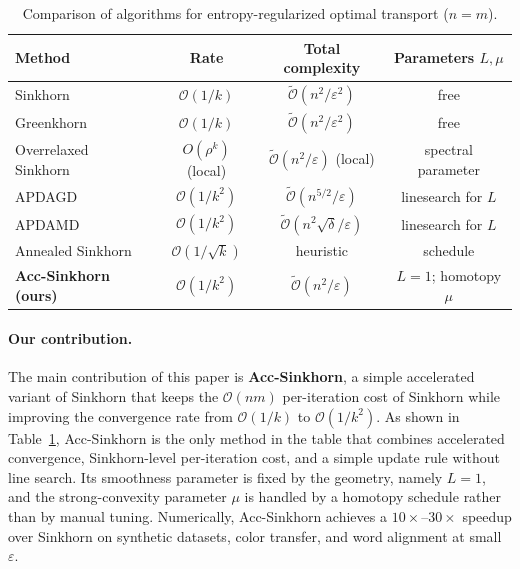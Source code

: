 \documentclass{article}
\theoremstyle{plain}
\theoremstyle{remark}
\begin{document}
\begin{table}[htp]
\centering
\caption{Comparison of algorithms for entropy-regularized optimal transport ($n=m$).}
\label{tab:comparison}
\renewcommand{\arraystretch}{1.3}
\begin{tabular}{lccc}
\toprule
\textbf{Method}
  & \textbf{Rate}
  & \textbf{Total complexity}
  & \textbf{Parameters $L,\mu$} \\
\midrule
Sinkhorn \citep{cuturi2013sinkhorn,altschuler2017near}
  & $\mathcal{O}(1/k)$
  & $\widetilde{\mathcal O}(n^2/\varepsilon^2)$
  & free \\

Greenkhorn \citep{altschuler2017near,lin2019efficient}
  & $\mathcal{O}(1/k)$
  & $\widetilde{\mathcal O}(n^2/\varepsilon^2)$
  & free \\

Overrelaxed Sinkhorn \citep{thibault2021overrelaxed}
  & $O(\rho^k)$ (local)
  & $\widetilde{\mathcal O}(n^2/\varepsilon)$ (local)
  & spectral parameter \\

APDAGD \citep{dvurechensky2018computational,lin2019efficient}
  & $\mathcal{O}(1/k^2)$
  & $\widetilde{\mathcal O}(n^{5/2}/\varepsilon)$
  & linesearch for $L$ \\

APDAMD \citep{lin2019efficient}
  & $\mathcal{O}(1/k^2)$
  & $\widetilde{\mathcal O}(n^2\sqrt{\delta}/\varepsilon)$
  & linesearch for $L$ \\

Annealed Sinkhorn \citep{chizat2024annealed}
  & $\mathcal{O}(1/\sqrt{k})$
  & heuristic
  & schedule \\

\midrule
\textbf{Acc-Sinkhorn (ours)}
  & $\mathcal{O}(1/k^2)$
  & $\widetilde{\mathcal O}(n^2/\varepsilon)$
  & $L=1$; homotopy $\mu$ \\
\bottomrule
\end{tabular}
\end{table}

\paragraph{Our contribution.}
The main contribution of this paper is \textbf{Acc-Sinkhorn}, a simple accelerated variant of Sinkhorn that keeps the $\mathcal O(nm)$ per-iteration cost of Sinkhorn while improving the convergence rate from $\mathcal{O}(1/k)$ to $\mathcal{O}(1/k^2)$. As shown in Table~\ref{tab:comparison}, Acc-Sinkhorn is the only method in the table that combines accelerated convergence, Sinkhorn-level per-iteration cost, and a simple update rule without line search. Its smoothness parameter is fixed by the geometry, namely $L=1$, and the strong-convexity parameter $\mu$ is handled by a homotopy schedule rather than by manual tuning. Numerically, Acc-Sinkhorn achieves a $10\times$--$30\times$ speedup over Sinkhorn on synthetic datasets, color transfer, and word alignment at small $\varepsilon$.
\end{document}
